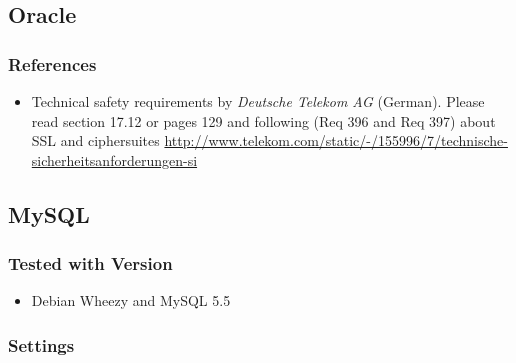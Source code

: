 
\subsection{Oracle}

\subsubsection{References}
\begin{itemize}
  \item Technical safety requirements by \emph{Deutsche Telekom AG} (German). Please read section 17.12 or pages 129 and following (Req 396 and Req 397) about SSL and ciphersuites \url{http://www.telekom.com/static/-/155996/7/technische-sicherheitsanforderungen-si}
\end{itemize}





\subsection{MySQL}
\subsubsection{Tested with Version}
\begin{itemize}
  \item Debian Wheezy and MySQL 5.5
\end{itemize}


\subsubsection{Settings}
